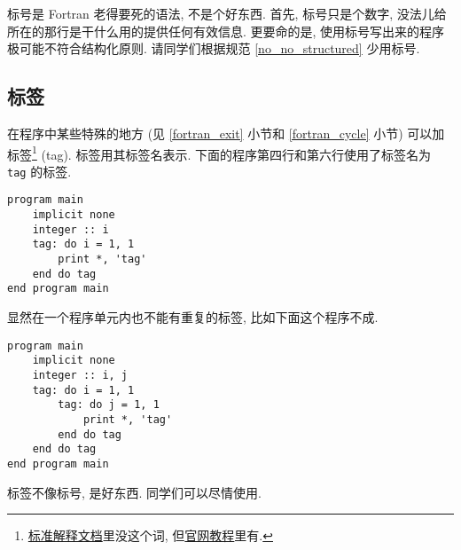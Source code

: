 标号是 Fortran 老得要死的语法, 不是个好东西. 首先, 标号只是个数字, 没法儿给所在的那行是干什么用的提供任何有效信息. 更要命的是, 使用标号写出来的程序极可能不符合结构化原则. 请同学们根据规范 \ref{no_no_structured} 少用标号.

\subsection{标签}

在程序中某些特殊的地方 (见 \ref{fortran_exit} 小节和 \ref{fortran_cycle} 小节) 可以加标签\footnote{\href{https://j3-fortran.org/doc/year/24/24-007.pdf}{标准解释文档}里没这个词, 但\href{https://fortran-lang.org/learn/quickstart/}{官网教程}里有.} (tag). 标签用其标签名表示. 下面的程序第四行和第六行使用了标签名为 \texttt{tag} 的标签.
\begin{lstlisting}
program main
    implicit none
    integer :: i
    tag: do i = 1, 1
        print *, 'tag'
    end do tag
end program main
\end{lstlisting}

显然在一个程序单元内也不能有重复的标签, 比如下面这个程序不成.
\begin{lstlisting}
program main
    implicit none
    integer :: i, j
    tag: do i = 1, 1
        tag: do j = 1, 1
            print *, 'tag'
        end do tag
    end do tag
end program main
\end{lstlisting}

标签不像标号, 是好东西. 同学们可以尽情使用.
